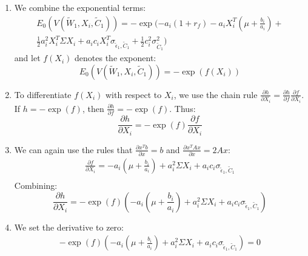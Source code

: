 \begin{enumerate}
    \item We combine the exponential terms:
    \begin{equation}
        \begin{aligned}
        E_0(V(\tilde{W}_1, X_i, \tilde{C}_1)) = -\exp(-a_i(1 + r_f) -a_i X_i^T(\mu + \frac{b_i}{a_i}) + \\
        \frac{1}{2}a_i^2 X_i^T \Sigma X_i + a_i c_i X_i^T \sigma_{\tilde{\epsilon}_1, \tilde{C}_1} + \frac{1}{2}c_i^2 \sigma^2_{\tilde{C}_1})
        \end{aligned}
    \end{equation}
    and let $f(X_i)$ denotes the exponent: 
    \begin{equation}
        E_0(V(\tilde{W}_1, X_i, \tilde{C}_1)) = -\exp(f(X_i))
    \end{equation}
    \item To differentiate $f(X_i)$ with respect to $X_i$, 
    we use the chain rule $\frac{\partial h}{\partial X_i} = \frac{\partial h}{\partial f} \frac{\partial f}{\partial X_i}$.
    If $h = - \exp(f)$, then $\frac{\partial h}{\partial f} = -\exp(f)$. Thus: 
    \begin{equation}
        \frac{\partial h}{\partial X_i} = -\exp(f) \frac{\partial f}{\partial X_i}
    \end{equation}
    \item We can again use the rules that $\frac{\partial x^T b}{\partial x} = b$ and 
    $\frac{\partial x^T A x}{\partial x} = 2Ax$:
    \begin{equation}
        \begin{aligned}
            \frac{\partial f}{\partial X_i} = -a_i(\mu + \frac{b_i}{a_i}) + a_i^2 \Sigma X_i + a_i c_i \sigma_{\tilde{\epsilon}_1, \tilde{C}_1} \\
        \end{aligned}
    \end{equation}
    Combining:
    \begin{equation}
        \frac{\partial h}{\partial X_i} = -\exp(f) (-a_i(\mu + \frac{b_i}{a_i}) + a_i^2 \Sigma X_i + a_i c_i \sigma_{\tilde{\epsilon}_1, \tilde{C}_1})
    \end{equation}
    \item We set the derivative to zero:
    \begin{equation}
        \begin{aligned}
            -\exp(f)(-a_i(\mu + \frac{b_i}{a_i}) + a_i^2 \Sigma X_i + a_i c_i \sigma_{\tilde{\epsilon}_1, \tilde{C}_1}) = 0 \\

\end{aligned}
\end{equation}
\end{enumerate}
